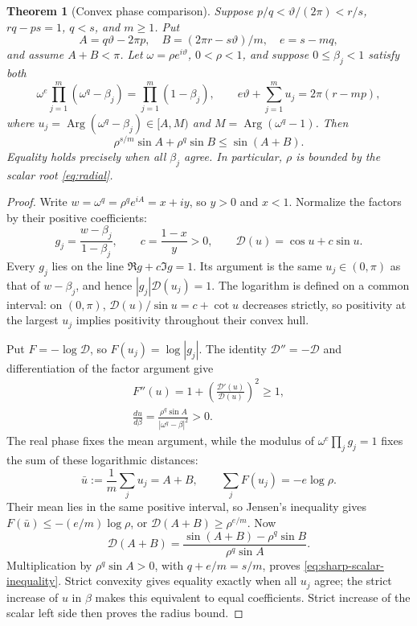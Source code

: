 \documentclass[11pt,a4paper]{article}
\newtheorem{theorem}{Theorem}[section]
\theoremstyle{definition}
\theoremstyle{remark}
\numberwithin{equation}{section}
\begin{document}
\begin{theorem}[Convex phase comparison]\label{thm:convex-product}\label{thm:jensen}
Suppose $p/q<\vartheta/(2\pi)<r/s$, $rq-ps=1$, $q<s$, and $m\ge1$.
Put
\[
 A=q\vartheta-2\pi p,\quad
 B=(2\pi r-s\vartheta)/m,\quad e=s-mq,
\]
and assume $A+B<\pi$.
Let $\omega=\rho e^{i\vartheta}$, $0<\rho<1$, and suppose $0\le\beta_j<1$ satisfy both
\begin{equation}\label{eq:analytic-product-phase}
 \omega^e\prod_{j=1}^m(\omega^q-\beta_j)=\prod_{j=1}^m(1-\beta_j),
 \qquad
 e\vartheta+\sum_{j=1}^m u_j=2\pi(r-mp),
\end{equation}
where $u_j=\operatorname{Arg}(\omega^q-\beta_j)\in[A,M)$ and
$M=\operatorname{Arg}(\omega^q-1)$.
Then
\begin{equation}\label{eq:sharp-scalar-inequality}
 \rho^{s/m}\sin A+\rho^q\sin B\le\sin(A+B).
\end{equation}
Equality holds precisely when all $\beta_j$ agree.
In particular, $\rho$ is bounded by the scalar root \eqref{eq:radial}.
\end{theorem}
\begin{proof}
Write $w=\omega^q=\rho^qe^{iA}=x+iy$, so $y>0$ and $x<1$.
Normalize the factors by their positive coefficients:
\[
 g_j=\frac{w-\beta_j}{1-\beta_j},\qquad
 c=\frac{1-x}{y}>0,\qquad
 \mathcal D(u)=\cos u+c\sin u.
\]
Every $g_j$ lies on the line $\Re g+c\Im g=1$. Its argument is the same
$u_j\in(0,\pi)$ as that of $w-\beta_j$, and hence
$|g_j|\mathcal D(u_j)=1$.
The logarithm is defined on a common interval: on $(0,\pi)$,
$\mathcal D(u)/\sin u=c+\cot u$ decreases strictly, so positivity
at the largest $u_j$ implies positivity throughout their convex hull.

Put $F=-\log\mathcal D$, so $F(u_j)=\log|g_j|$.
The identity $\mathcal D''=-\mathcal D$ and
differentiation of the factor argument give
\begin{equation}\label{eq:one-factor-convexity}
 \begin{gathered}
 F''(u)=1+\left(\frac{\mathcal D'(u)}{\mathcal D(u)}\right)^2
       \ge1,\\
 \frac{du}{d\beta}=\frac{\rho^q\sin A}{|\omega^q-\beta|^2}>0.
 \end{gathered}
\end{equation}
The real phase fixes the mean argument, while the modulus of
$\omega^e\prod_jg_j=1$ fixes the sum of these logarithmic distances:
\[
 \bar u:=\frac1m\sum_j u_j=A+B,\qquad
 \sum_jF(u_j)=-e\log\rho.
\]
Their mean lies in the same positive interval, so Jensen's inequality gives
$F(\bar u)\le-(e/m)\log\rho$, or
$\mathcal D(A+B)\ge\rho^{e/m}$. Now
\[
 \mathcal D(A+B)
 =\frac{\sin(A+B)-\rho^q\sin B}{\rho^q\sin A}.
\]
Multiplication by $\rho^q\sin A>0$, with $q+e/m=s/m$, proves
\eqref{eq:sharp-scalar-inequality}. Strict convexity gives equality exactly
when all $u_j$ agree; the strict increase of $u$ in $\beta$ makes this
equivalent to equal coefficients. Strict increase of the scalar left side
then proves the radius bound.
\end{proof}
\end{document}
